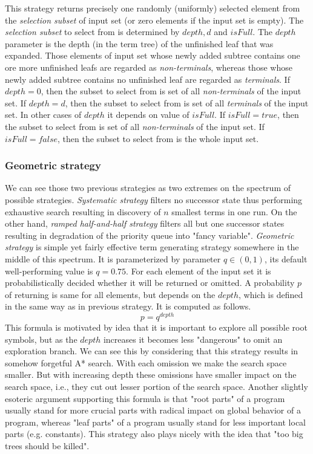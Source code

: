 \documentclass{llncs}
\begin{document}
This strategy returns precisely one randomly
(uniformly) selected  element from 
the \textit{selection subset} of input set
(or zero elements if the input set is empty). 
The \textit{selection subset} 
to select from is determined by $depth, d$ and $isFull$.
The $depth$ parameter is the depth (in the term tree) 
of the unfinished leaf that was expanded.
Those elements of input set whose newly added subtree contains one ore more 
unfinished leafs are regarded as \textit{non-terminals}, whereas 
those whose newly added subtree contains no unfinished leaf are regarded as 
\textit{terminals}.
If $depth = 0$, then the subset to select from is  
set of all \textit{non-terminals} of the input set.
If $depth = d$, then the subset to select from is
set of all \textit{terminals} of the input set.
In other cases of $depth$ it depends on value of $isFull$.
If $isFull = true$, then the subset to select from is 
set of all \textit{non-terminals} of the input set.
If $isFull = false$, then the subset to select from is 
the whole input set.

\subsubsection{Geometric strategy}

We can see those two previous strategies as two extremes on the spectrum of 
possible strategies. 
\textit{Systematic strategy} filters no successor state thus performing
exhaustive search resulting in discovery of $n$ smallest terms in one run.
On the other hand, \textit{ramped half-and-half strategy} filters 
all but one successor states resulting in degradation of 
the priority queue into "fancy variable".
\textit{Geometric strategy} is simple yet fairly effective term generating 
strategy somewhere in the middle of this spectrum.
It is parameterized by parameter $q \in (0,1)$, its default well-performing 
value is $q = 0.75$.
For each element of the input set 
it is probabilistically decided whether
it will be returned or omitted. A probability $p$ of returning is
same for all elements, but depends on the $depth$, 
which is defined in the same way as in previous strategy. 
It is computed as follows.
$$ p = q^{depth} $$
This formula is motivated by idea that it is important to
explore all possible root symbols, but as the $depth$ 
increases it becomes less "dangerous" to omit 
an exploration branch. 
We can see this by considering that this strategy results in
somehow forgetful A* search.
With each omission we make the search space smaller. But with
increasing depth these omissions have smaller impact on the search space,
i.e., they cut out lesser portion of the search space.
Another slightly esoteric argument supporting this formula is that "root 
parts" of a program usually stand for more crucial parts
with radical impact on global behavior of a program, 
whereas "leaf parts" of a program usually
stand for less important local parts (e.g. constants).  
This strategy also plays nicely with the idea that 
"too big trees should be killed".
\end{document}
